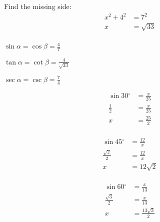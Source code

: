 \documentclass{exam}
\newcommand{\dg}{\ensuremath{^\circ}}
\begin{document}
\begin{description}

      \item[8]
        Find the missing side:
        \begin{align*}
          x^2 + 4^2 & = 7^2 \\
          x         & = \sqrt{33} \\
        \end{align*}

        \begin{parts}
           \item $\sin \alpha = \cos \beta = \boxed{ \frac{4}{7} }$
           \item $\tan \alpha = \cot \beta = \boxed{ \frac{4}{\sqrt{33}} }$
           \item $\sec \alpha = \csc \beta = \boxed{ \frac{7}{4} }$
        \end{parts}

      \item[9]
        \begin{align*}
          \sin 30 \dg & = \frac{x}{25} \\
          \frac{1}{2}     & = \frac{x}{25} \\
          x               & = \boxed{ \frac{25}{2} } \\
        \end{align*}

      \item[10]
        \begin{align*}
          \sin 45 \dg    & = \frac{12}{x} \\
          \frac{\sqrt{2}}{2} & = \frac{12}{x} \\
          x                  & = \boxed{ 12 \sqrt{2} } \\
        \end{align*}

      \item[11]
        \begin{align*}
          \sin 60 \dg    & = \frac{x}{13} \\
          \frac{\sqrt{3}}{2} & = \frac{x}{13} \\
          x                  & = \boxed{ \frac{13 \sqrt{3}}{2} } \\
        \end{align*}


\end{description}
\end{document}
